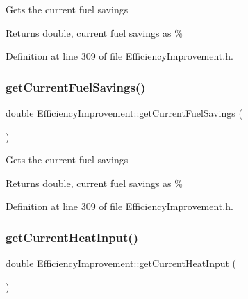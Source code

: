Gets the current fuel savings

\begin{DoxyReturn}{Returns}
double, current fuel savings as \% 
\end{DoxyReturn}


Definition at line 309 of file Efficiency\+Improvement.\+h.

\mbox{\label{class_efficiency_improvement_ab2e940be7192df960c9eb9578096796f}} 
\subsubsection{\texorpdfstring{get\+Current\+Fuel\+Savings()}{getCurrentFuelSavings()}\hspace{0.1cm}{\footnotesize\ttfamily [3/3]}}
{\footnotesize\ttfamily double Efficiency\+Improvement\+::get\+Current\+Fuel\+Savings (\begin{DoxyParamCaption}{ }\end{DoxyParamCaption})\hspace{0.3cm}{\ttfamily [inline]}}

Gets the current fuel savings

\begin{DoxyReturn}{Returns}
double, current fuel savings as \% 
\end{DoxyReturn}


Definition at line 309 of file Efficiency\+Improvement.\+h.

\mbox{\label{class_efficiency_improvement_af43c4706cb5cd67ce58e9c4356e4564c}} 
\subsubsection{\texorpdfstring{get\+Current\+Heat\+Input()}{getCurrentHeatInput()}\hspace{0.1cm}{\footnotesize\ttfamily [1/3]}}
{\footnotesize\ttfamily double Efficiency\+Improvement\+::get\+Current\+Heat\+Input (\begin{DoxyParamCaption}{ }\end{DoxyParamCaption})}

